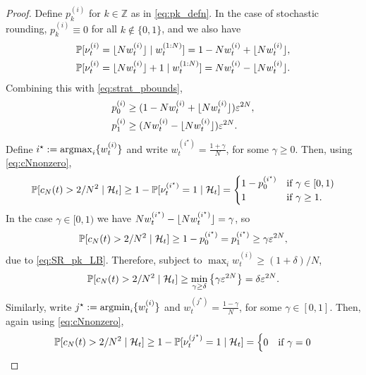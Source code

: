 \begin{proof}
Define $p_k^{(i)}$ for $k\in\mathbb{Z}$ as in \eqref{eq:pk_defn}. In the case of stochastic rounding,
$p_{k}^{(i)} \equiv 0$ for all $k\notin\{0,1\}$, and we also have
\begin{align*}
&\Prob[ \nu_t^{(i)} = \flnw \mid w_t^{(1:N)} ]
= 1- N w_t^{(i)} + \flnw , \\
&\Prob[ \nu_t^{(i)} = \flnw +1 \mid w_t^{(1:N)} ]
= N w_t^{(i)} - \flnw .
\end{align*}
Combining this with \eqref{eq:strat_pbounds},
\begin{align}
p_0^{(i)} 
&\geq ( 1- N w_t^{(i)} + \flnw ) \varepsilon^{2N} , \notag\\
p_1^{(i)} 
&\geq ( N w_t^{(i)} - \flnw ) \varepsilon^{2N} . \label{eq:SR_pk_LB}
\end{align}
Define $i^\star := \argmax_i \{ w_t^{(i)} \}$ and write
$w_t^{(i^\star)} = \frac{1+\gamma}{N}$, for some $\gamma \geq 0$.
Then, using \eqref{eq:cNnonzero}, 
\begin{equation*}
\Prob[ c_N(t) > 2/N^2 \mid \mathcal{H}_t ]
\geq 1- \Prob[ \nu_t^{(i^\star)} =1 \mid \mathcal{H}_t ]
= \begin{cases}
    1 - p_0^{(i^\star)} & \text{if } \gamma \in [0,1) \\
    1 & \text{if } \gamma \geq 1 .
\end{cases}
\end{equation*}
In the case $\gamma \in [0,1)$ we have $N w_t^{(i^\star)} - \flnw[i^\star] = \gamma$, so
\begin{equation*}
\Prob[ c_N(t) > 2/N^2 \mid \mathcal{H}_t ]
\geq 1 - p_0^{(i^\star)}
= p_1^{(i^\star)}
\geq \gamma \varepsilon^{2N} ,
\end{equation*}
due to \eqref{eq:SR_pk_LB}.
Therefore, subject to $\max_i w_t^{(i)} \geq (1+\delta)/N$,
\begin{equation*}
\Prob[ c_N(t) > 2/N^2 \mid \mathcal{H}_t ]
\geq \min_{\gamma \geq \delta} 
        \left\{ \gamma \varepsilon^{2N} \right\}
= \delta \varepsilon^{2N} .
\end{equation*}
Similarly, write $j^\star := \argmin_i \{ w_t^{(i)} \}$ and
$w_t^{(j^\star)} = \frac{1-\gamma}{N}$, for some 
$\gamma \in [0,1]$.
Then, again using \eqref{eq:cNnonzero},
\begin{equation*}
\Prob[ c_N(t) > 2/N^2 \mid \mathcal{H}_t ]
\geq 1- \Prob[ \nu_t^{(j^\star)} =1 \mid \mathcal{H}_t ]
= \begin{cases}
    0 & \text{if } \gamma = 0 \\

\end{cases}
\end{equation*}
\end{proof}
